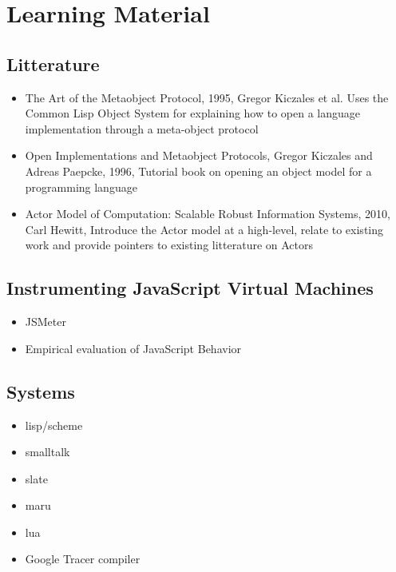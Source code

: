 \section{Learning Material}

\subsection{Litterature}
\begin{itemize}
    \item The Art of the Metaobject Protocol, 1995, Gregor Kiczales et al. Uses
        the Common Lisp Object System for explaining how to open a
        language implementation through a meta-object protocol
    \item Open Implementations and Metaobject Protocols, Gregor Kiczales and
        Adreas Paepcke, 1996, Tutorial book on opening an object model for a
        programming language
    \item Actor Model of Computation: Scalable Robust Information Systems,
        2010, Carl Hewitt, Introduce the Actor model at a high-level, relate to
        existing work and provide pointers to existing litterature on Actors
\end{itemize}

\subsection{Instrumenting JavaScript Virtual Machines}
\begin{itemize}
    \item JSMeter
    \item Empirical evaluation of JavaScript Behavior
\end{itemize}


\subsection{Systems}
\begin{itemize}
    \item lisp/scheme
    \item smalltalk
    \item slate
    \item maru
    \item lua
    \item Google Tracer compiler
\end{itemize}
